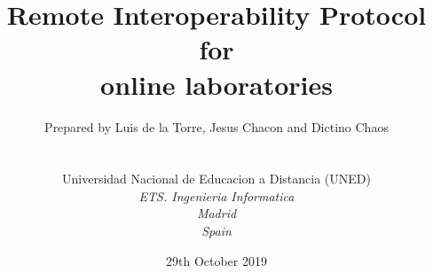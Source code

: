 
\def\Company{Universidad Nacional de Educacion a Distancia (UNED)}
\def\Institute{\textit{ETS. Ingenieria Informatica}}
\def\City{\textit{Madrid}}
\def\Country{\textit{Spain}}

\def\BoldTitle{Remote Interoperability Protocol}

\def\Subtitle{for \\ online laboratories \\}
\def\Authors{Prepared by Luis de la Torre, Jesus Chacon and Dictino Chaos } 
\def\Shortname{L. de la Torre, J. Chacon, D. Chaos}


\title{\textbf{\BoldTitle}\\\Subtitle}
\author{\Authors \\ \\ \\ \Company \\ \Institute\\ \City\\ \Country}
\date{29th October 2019}

